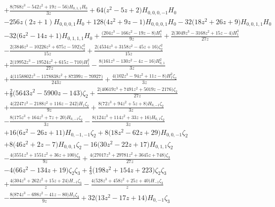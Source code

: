 \begin{eqnarray}
\nonumber \\ &&
+\frac{8 \big(768 z^3-542 z^2+19 z-56\big) H_{0,1,1}  H_0}{3 z}+64 \big(z^2-5 z+2\big) H_{0,0,0,-1} H_0
\nonumber \\ &&
-256  z (2 z+1)H_{0,0,0,1} H_0
+128 \big(4 z^2+9 z-1\big) H_{0,0,0,1} H_0-32 \big(18 z^2+26z+9\big) H_{0,0,1,1} H_0
\nonumber \\ &&
-32 \big(6 z^2-14 z+1\big) H_{0,1,1,1}H_0
+\frac{\big(204 z^3-166 z^2-19 z-8\big) H_1^4}{9 z}
+\frac{2 \big(3049  z^3-3168 z^2+15 z-4\big) H_1^3}{27 z}
\nonumber \\ &&
-\frac{2 \big(3846 z^3-10226 z^2+675  z-592\big) \zeta_2^2}{15 z}+\frac{2  \big(4534 z^3+3158 z^2-45  z+16\big) \zeta_2^2}{15 z}
\nonumber \\ &&
+\frac{2 \big(19952 z^3-19524 z^2+615  z-710\big) H_1^2}{27 z}-\frac{8 \big(161 z^3-130 z^2-4 z-16\big)  H_{0,1}^2}{3 z}
\nonumber \\ &&
+\frac{4 \big(1158802 z^3-1178838 z^2+87399 z-70927\big)}{243  z}+\frac{4 \big(102 z^3-94 z^2+11 z-8\big) H_1^2 \zeta_2}{3  z}
\nonumber \\ &&
+\frac{2}{9}  \big(5643 z^2-5900 z-143\big) \zeta_2+\frac{2  \big(40619 z^3+7491 z^2+5019 z-2176\big) \zeta_2}{27 z}
\nonumber \\ &&
+\frac{4  \big(2247 z^3-2188 z^2+116 z-242\big) H_1 \zeta_2}{9 z}+\frac{8 \big(72  z^3+94 z^2+5 z+8\big) H_{0,-1} \zeta_2}{3 z}
\nonumber \\ &&
-\frac{8  \big(175  z^3+164 z^2+7 z+20\big) H_{0,-1} \zeta_2}{3 z}-\frac{8 \big(124 z^3+114  z^2+33 z+16\big) H_{0,1} \zeta_2}{3 z}
\nonumber \\ &&
+16  \big(6 z^2-26z+11\big) H_{0,-1,-1} \zeta_2+8  \big(18 z^2-62 z+29\big)H_{0,0,-1} \zeta_2
\nonumber \\ &&
+8 \big(46 z^2+2 z-7\big) H_{0,0,1} \zeta_2-16\big(30 z^2-22 z+17\big) H_{0,1,1} \zeta_2
\nonumber \\ &&
-\frac{4  \big(3551  z^3+1551 z^2+36 z+100\big) \zeta_3}{9 z}+\frac{4 \big(27017 z^3+29781  z^2+3645 z+748\big) \zeta_3}{27 z}
\nonumber \\ &&
-4  \big(66 z^2-134 z+19\big)\zeta_2 \zeta_3+\frac{4}{3} \big(198 z^2+154 z+223\big) \zeta_2\zeta_3
\nonumber \\ &&
+\frac{4  \big(304 z^3+262 z^2+15 z+24\big) H_{-1}  \zeta_3}{z}-\frac{4 \big(528 z^3+458 z^2+25 z+40\big) H_{-1} \zeta_3}{z}
\nonumber \\ &&
-\frac{8 \big(874 z^3-698 z^2-41 z-80\big) H_1 \zeta_3}{9 z}+32\big(13 z^2-17 z+14\big) H_{0,-1} \zeta_3

\end{eqnarray}
